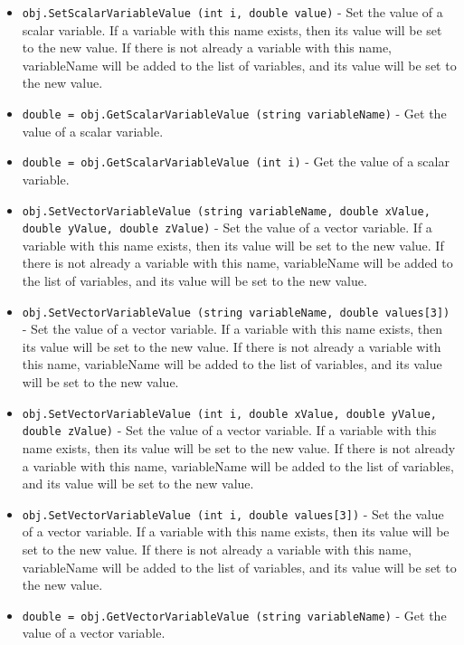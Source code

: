 \begin{itemize}
\item  \verb|obj.SetScalarVariableValue (int i, double value)| -  Set the value of a scalar variable.  If a variable with this name
 exists, then its value will be set to the new value.  If there is not
 already a variable with this name, variableName will be added to the
 list of variables, and its value will be set to the new value.

\item  \verb|double = obj.GetScalarVariableValue (string variableName)| -  Get the value of a scalar variable.

\item  \verb|double = obj.GetScalarVariableValue (int i)| -  Get the value of a scalar variable.

\item  \verb|obj.SetVectorVariableValue (string variableName, double xValue, double yValue, double zValue)| -  Set the value of a vector variable.  If a variable with this name
 exists, then its value will be set to the new value.  If there is not
 already a variable with this name, variableName will be added to the
 list of variables, and its value will be set to the new value.

\item  \verb|obj.SetVectorVariableValue (string variableName, double values[3])| -  Set the value of a vector variable.  If a variable with this name
 exists, then its value will be set to the new value.  If there is not
 already a variable with this name, variableName will be added to the
 list of variables, and its value will be set to the new value.

\item  \verb|obj.SetVectorVariableValue (int i, double xValue, double yValue, double zValue)| -  Set the value of a vector variable.  If a variable with this name
 exists, then its value will be set to the new value.  If there is not
 already a variable with this name, variableName will be added to the
 list of variables, and its value will be set to the new value.

\item  \verb|obj.SetVectorVariableValue (int i, double values[3])| -  Set the value of a vector variable.  If a variable with this name
 exists, then its value will be set to the new value.  If there is not
 already a variable with this name, variableName will be added to the
 list of variables, and its value will be set to the new value.

\item  \verb|double = obj.GetVectorVariableValue (string variableName)| -  Get the value of a vector variable.


\end{itemize}
